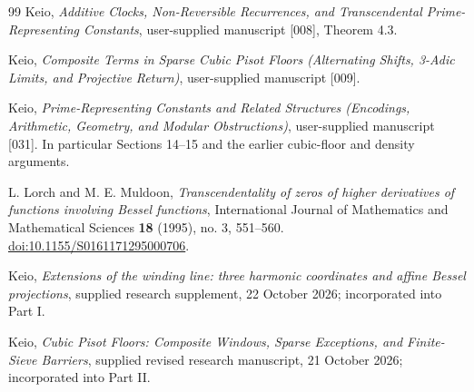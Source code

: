 \documentclass[11pt,a4paper]{article}
\theoremstyle{definition}\newtheorem{definition}[theorem]{Definition}
\theoremstyle{remark}\newtheorem{remark}[theorem]{Remark}
\begin{document}
\begin{thebibliography}{99}
 Keio,
\emph{Additive Clocks, Non-Reversible Recurrences, and Transcendental
Prime-Representing Constants}, user-supplied manuscript [008],
Theorem 4.3.

 Keio,
\emph{Composite Terms in Sparse Cubic Pisot Floors
(Alternating Shifts, 3-Adic Limits, and Projective Return)},
user-supplied manuscript [009].

 Keio,
\emph{Prime-Representing Constants and Related Structures
(Encodings, Arithmetic, Geometry, and Modular Obstructions)},
user-supplied manuscript [031]. In particular Sections 14--15 and
the earlier cubic-floor and density arguments.

 L. Lorch and M. E. Muldoon, \emph{Transcendentality of zeros
of higher derivatives of functions involving Bessel functions},
International Journal of Mathematics and Mathematical Sciences
\textbf{18} (1995), no. 3, 551--560.
\href{https://doi.org/10.1155/S0161171295000706}{doi:10.1155/S0161171295000706}.

 Keio, \emph{Extensions of the winding line: three harmonic
coordinates and affine Bessel projections}, supplied research supplement,
22 October 2026; incorporated into Part I.

 Keio, \emph{Cubic Pisot Floors: Composite Windows,
Sparse Exceptions, and Finite-Sieve Barriers}, supplied revised research
manuscript, 21 October 2026; incorporated into Part II.

\end{thebibliography}
\end{document}
